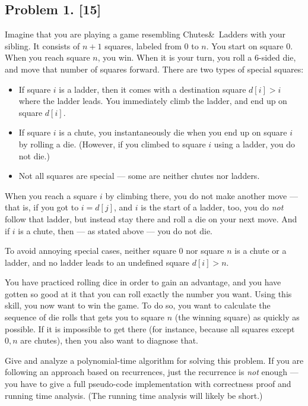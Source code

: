 \documentclass[10pt]{article}
\begin{document}
\newpage

\subsection*{Problem 1. [15]}
  Imagine that you are playing a game resembling Chutes\&\ Ladders with your sibling. It consists of $n+1$ squares, labeled from $0$ to $n$. You start on square 0. When you reach square $n$, you win. When it is your turn, you roll a 6-sided die, and move that number of squares forward. There are two types of special squares:
  \begin{itemize}
    \item If square $i$ is a ladder, then it comes with a destination square $d[i] > i$ where the ladder leads. You immediately climb the ladder, and end up on square $d[i]$.
    \item If square $i$ is a chute, you instantaneously die when you end up on square $i$ by rolling a die. (However, if you climbed to square $i$ using a ladder, you do not die.)
    \item Not all squares are special --- some are neither chutes nor ladders.
  \end{itemize}

  When you reach a square $i$ by climbing there, you do not make another move --- that is, if you got to $i=d[j]$, and $i$ is the start of a ladder, too, you do \emph{not} follow that ladder, but instead stay there and roll a die on your next move. And if $i$ is a chute, then --- as stated above --- you do not die.

  To avoid annoying special cases, neither square $0$ nor square $n$ is a chute or a ladder, and no ladder leads to an undefined square $d[i] > n$.
  
  You have practiced rolling dice in order to gain an advantage, and you have gotten so good at it that you can roll exactly the number you want. Using this skill, you now want to win the game. To do so, you want to calculate the sequence of die rolls that gets you to square $n$ (the winning square) as quickly as possible. If it is impossible to get there (for instance, because all squares except $0, n$ are chutes), then you also want to diagnose that.

  Give and analyze a polynomial-time algorithm for solving this problem. If you are following an approach based on recurrences, just the recurrence is \emph{not} enough --- you have to give a full pseudo-code implementation with correctness proof and running time analysis. (The running time analysis will likely be short.)
\end{document}
